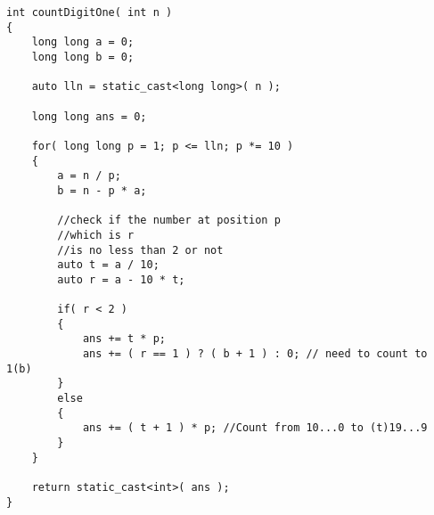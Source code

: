 \setcounter{lstlisting}{0}
\begin{lstlisting}[style=customc, caption={Mathematical Induction}]
int countDigitOne( int n )
{
    long long a = 0;
    long long b = 0;

    auto lln = static_cast<long long>( n );

    long long ans = 0;

    for( long long p = 1; p <= lln; p *= 10 )
    {
        a = n / p;
        b = n - p * a;

        //check if the number at position p
        //which is r
        //is no less than 2 or not
        auto t = a / 10;
        auto r = a - 10 * t;

        if( r < 2 )
        {
            ans += t * p;
            ans += ( r == 1 ) ? ( b + 1 ) : 0; // need to count to 1(b)
        }
        else
        {
            ans += ( t + 1 ) * p; //Count from 10...0 to (t)19...9
        }
    }

    return static_cast<int>( ans );
}
\end{lstlisting}